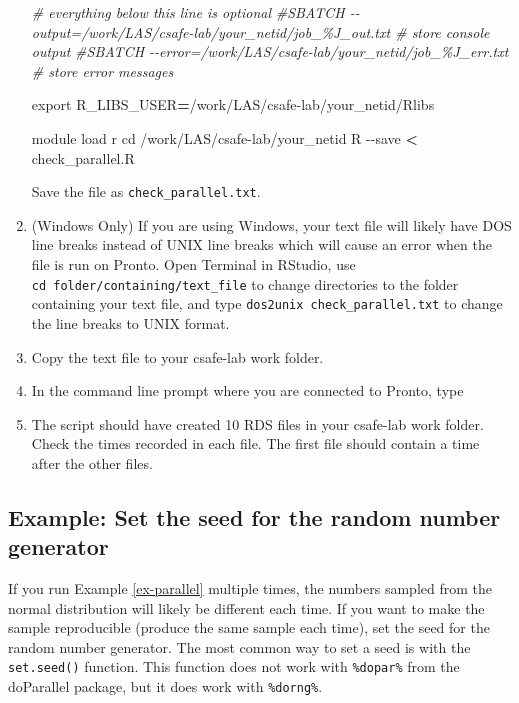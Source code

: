 \documentclass[
]{book}
\newenvironment{Shaded}{\begin{snugshade}}{\end{snugshade}}
\newcommand{\AttributeTok}[1]{\textcolor[rgb]{0.77,0.63,0.00}{#1}}
\newcommand{\BuiltInTok}[1]{#1}
\newcommand{\CommentTok}[1]{\textcolor[rgb]{0.56,0.35,0.01}{\textit{#1}}}
\newcommand{\ExtensionTok}[1]{#1}
\newcommand{\NormalTok}[1]{#1}
\newcommand{\OperatorTok}[1]{\textcolor[rgb]{0.81,0.36,0.00}{\textbf{#1}}}
\newcommand{\VariableTok}[1]{\textcolor[rgb]{0.00,0.00,0.00}{#1}}
\begin{document}
\begin{enumerate}
\begin{Shaded}
\begin{Highlighting}[]
\CommentTok{\# everything below this line is optional}
\CommentTok{\#SBATCH {-}{-}output=/work/LAS/csafe{-}lab/your\_netid/job\_\%J\_out.txt \# store console output}
\CommentTok{\#SBATCH {-}{-}error=/work/LAS/csafe{-}lab/your\_netid/job\_\%J\_err.txt \# store error messages}

\BuiltInTok{export} \VariableTok{R\_LIBS\_USER}\OperatorTok{=}\NormalTok{/work/LAS/csafe{-}lab/your\_netid/Rlibs}

\ExtensionTok{module}\NormalTok{ load r}
\BuiltInTok{cd}\NormalTok{ /work/LAS/csafe{-}lab/your\_netid}
\ExtensionTok{R} \AttributeTok{{-}{-}save} \OperatorTok{\textless{}}\NormalTok{ check\_parallel.R}
\end{Highlighting}
\end{Shaded}

  Save the file as \texttt{check\_parallel.txt}.
\item
  (Windows Only) If you are using Windows, your text file will likely have DOS line breaks instead of UNIX line breaks which will cause an error when the file is run on Pronto. Open Terminal in RStudio, use \texttt{cd\ folder/containing/text\_file} to change directories to the folder containing your text file, and type \texttt{dos2unix\ check\_parallel.txt} to change the line breaks to UNIX format.
\item
  Copy the text file to your csafe-lab work folder.
\item
  In the command line prompt where you are connected to Pronto, type

\begin{Shaded}
\end{Shaded}
\item
  The script should have created 10 RDS files in your csafe-lab work folder. Check the times recorded in each file. The first file should contain a time after the other files.
\end{enumerate}

\hypertarget{ex-seed}{%
\subsection{Example: Set the seed for the random number generator}\label{ex-seed}}

If you run Example \ref{ex-parallel} multiple times, the numbers sampled from the normal distribution will likely be different each time. If you want to make the sample reproducible
(produce the same sample each time), set the seed for the random number generator. The most common way to set a seed is with the \texttt{set.seed()} function. This function does not work with \texttt{\%dopar\%} from the doParallel package, but it does work with \texttt{\%dorng\%}.
\end{document}
